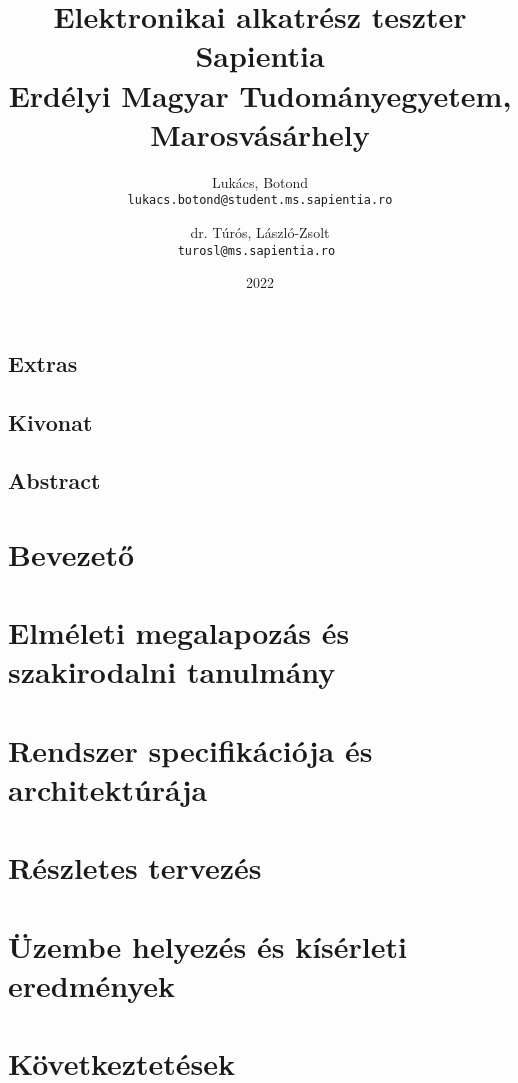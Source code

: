 \documentclass[12pt, twosides]{report}
\title{
	{Elektronikai alkatrész teszter}\\
	{\large Sapientia\\
	Erdélyi Magyar Tudományegyetem, Marosvásárhely}
}
\author{
	Lukács, Botond\\
	\texttt{lukacs.botond@student.ms.sapientia.ro}
	\and
	dr. Túrós, László-Zsolt\\
	\texttt{turosl@ms.sapientia.ro }	
}
\date{2022}
\begin{document}



\section*{Extras}

\pagebreak



\section*{Kivonat}

\pagebreak

\section*{Abstract}

\pagebreak


\tableofcontents

\listoffigures

\chapter{Bevezető}


\chapter{Elméleti megalapozás és szakirodalni tanulmány}


\chapter{Rendszer specifikációja és architektúrája}


\chapter{Részletes tervezés}


\chapter{Üzembe helyezés és kísérleti eredmények}


\chapter{Következtetések}






%
\end{document}
